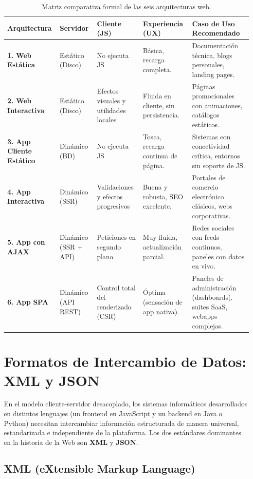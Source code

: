 \begin{table}[htbp]
\centering
\caption{Matriz comparativa formal de las seis arquitecturas web.}
\label{tab:comparativa-arquitecturas}
\footnotesize
\begin{tabularx}{\textwidth}{l p{2cm} p{2.2cm} p{2.2cm} X}
\toprule
\textbf{Arquitectura} & \textbf{Servidor} & \textbf{Cliente (JS)} & \textbf{Experiencia (UX)} & \textbf{Caso de Uso Recomendado} \\
\midrule
\textbf{1. Web Estática} & Estático (Disco) & No ejecuta JS & Básica, recarga completa. & Documentación técnica, blogs personales, landing pages. \\
\textbf{2. Web Interactiva} & Estático (Disco) & Efectos visuales y utilidades locales & Fluida en cliente, sin persistencia. & Páginas promocionales con animaciones, catálogos estáticos. \\
\textbf{3. App Cliente Estático} & Dinámico (BD) & No ejecuta JS & Tosca, recarga continua de página. & Sistemas con conectividad crítica, entornos sin soporte de JS. \\
\textbf{4. App Interactiva} & Dinámico (SSR) & Validaciones y efectos progresivos & Buena y robusta, SEO excelente. & Portales de comercio electrónico clásicos, webs corporativas. \\
\textbf{5. App con AJAX} & Dinámico (SSR + API) & Peticiones en segundo plano & Muy fluida, actualización parcial. & Redes sociales con feeds continuos, paneles con datos en vivo. \\
\textbf{6. App SPA} & Dinámico (API REST) & Control total del renderizado (CSR) & Óptima (sensación de app nativa). & Paneles de administración (dashboards), suites SaaS, webapps complejas. \\
\bottomrule
\end{tabularx}
\end{table}
\section{Formatos de Intercambio de Datos: XML y JSON}

En el modelo cliente-servidor desacoplado, los sistemas informáticos desarrollados en distintos lenguajes (un frontend en JavaScript y un backend en Java o Python) necesitan intercambiar información estructurada de manera universal, estandarizada e independiente de la plataforma. Los dos estándares dominantes en la historia de la Web son \textbf{XML} y \textbf{JSON}.

\subsection{XML (eXtensible Markup Language)}

